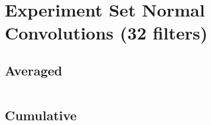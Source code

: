 \documentclass{article}%
\begin{document}
%
\normalsize%
\section{Experiment Set Normal Convolutions (32 filters)}%
\label{sec:Experiment Set Normal Convolutions (32 filters)}%
\subsection{Averaged}%
\label{subsec:Averaged}%
\begin{tabular}{|r|c|}%
\hline%
\end{tabular}

%
\subsection{Cumulative}%
\label{subsec:Cumulative}%
\begin{tabular}{|r|c|}%
\hline%
\end{tabular}

%
\end{document}
